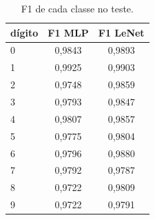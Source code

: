 \begin{table}[!t]
\centering
\caption{F1 de cada classe no teste.}
\label{tab:f1classes}
\begin{tabular}{lcc}
\hline
dígito & F1 MLP & F1 LeNet \\
\hline
0 & 0,9843 & 0,9893 \\
1 & 0,9925 & 0,9903 \\
2 & 0,9748 & 0,9859 \\
3 & 0,9793 & 0,9847 \\
4 & 0,9807 & 0,9857 \\
5 & 0,9775 & 0,9804 \\
6 & 0,9796 & 0,9880 \\
7 & 0,9792 & 0,9787 \\
8 & 0,9722 & 0,9809 \\
9 & 0,9722 & 0,9791 \\
\hline
\end{tabular}
\end{table}